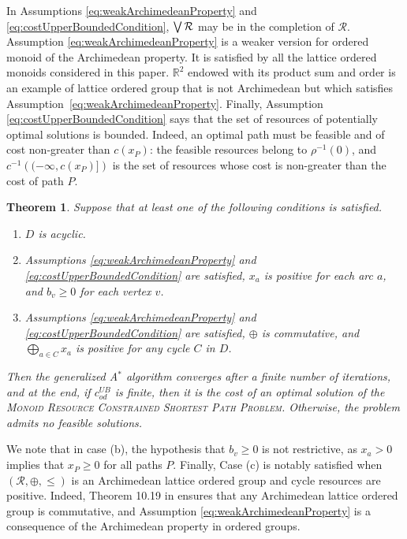 \documentclass[11pt]{amsart}
\theoremstyle{plain}
\newtheorem{theo}{Theorem}
\theoremstyle{remark}
\def\R{\mathbb{R}}
\newcommand{\MRCSP}{\textsc{Monoid Resource Constrained Shortest Path Problem}\xspace}
\newcommand{\rplus}{\oplus}
\newcommand{\bigrplus}{\bigoplus}
\newcommand{\rleq}{\leqslant}
\newcommand{\rgeq}{\geqslant}
\newcommand{\rset}{\mathcal{R}}
\newcommand{\rcost}{c}
\newcommand{\rmeas}{\rho}
\newcommand{\re}{x}
\begin{document}
In Assumptions \eqref{eq:weakArchimedeanProperty} and \eqref{eq:costUpperBoundedCondition}, $\bigjoin \rset$ may be in the completion of $\rset$. Assumption \eqref{eq:weakArchimedeanProperty} is a weaker version for ordered monoid of the Archimedean property. 
It is satisfied by all the lattice ordered monoids considered in this paper. $\R^{2}$ endowed with its product sum and order is an example of lattice ordered group that is not Archimedean but which satisfies Assumption~\eqref{eq:weakArchimedeanProperty}. Finally, Assumption \eqref{eq:costUpperBoundedCondition} says that the set of resources of potentially optimal solutions is bounded. Indeed, an optimal path must be feasible and of cost non-greater than $\rcost(\re_{P})$: the feasible resources belong to $\rmeas^{-1}(0)$, and $c^{-1}\left((-\infty,c(\re_{P})]\right)$ is the set of resources whose cost is non-greater than the cost of path $P$.
\begin{theo}\label{theo:labelSettingConvergence}
Suppose that at least one of the following conditions is satisfied.
\begin{enumerate}\item[(a)] $D$ is acyclic.
 	\item[(b)] Assumptions \eqref{eq:weakArchimedeanProperty} and \eqref{eq:costUpperBoundedCondition} are satisfied, $\re_{a}$ is positive for each arc $a$, and $b_{v} \rgeq 0$ for each vertex $v$.
 	\item[(c)] Assumptions \eqref{eq:weakArchimedeanProperty} and \eqref{eq:costUpperBoundedCondition} are satisfied, $\rplus$ is commutative, and $\bigrplus_{a \in C}\re_{a}$ is positive for any cycle $C$ in $D$.
 \end{enumerate}
 \noindent Then the generalized A$^{*}$ algorithm converges after a finite number of iterations, and at the end, if  $c_{od}^{UB}$ is finite, then it is the cost of an optimal solution of the \MRCSP. Otherwise, the problem admits no feasible solutions. 
\end{theo}

We note that in case (b), the hypothesis that $b_{v}\rgeq 0$ is not restrictive, as $\re_{a}> 0$ implies that $\re_{P} \rgeq 0$ for all paths $P$. Finally, Case (c) is notably satisfied when $(\rset,\rplus,\rleq)$ is an Archimedean lattice ordered group and cycle resources are positive. Indeed, Theorem 10.19 in \cite{blyth2005lattices} ensures that any Archimedean lattice ordered group is commutative, and Assumption \eqref{eq:weakArchimedeanProperty} is a consequence of the Archimedean property in ordered groups.
\end{document}
